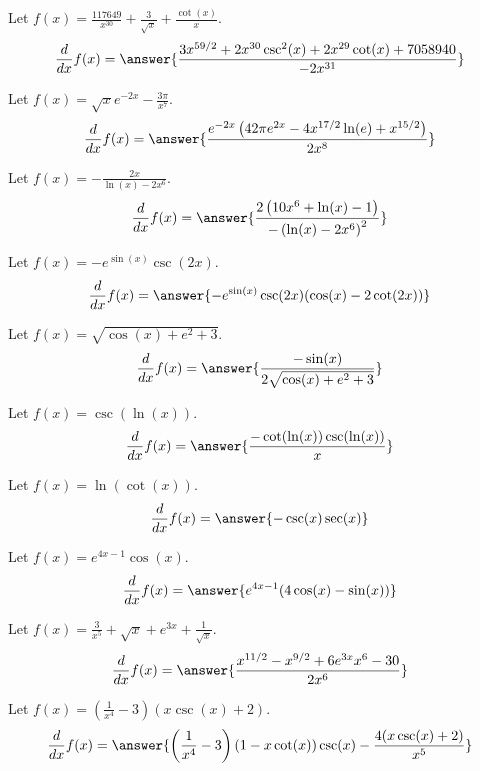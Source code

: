 \documentclass{ximera}
\begin{document}
\begin{shuffle}
\begin{exercise}
Let $f(x)=\frac{117649}{x^{30}}+\frac{3}{\sqrt{x}}+\frac{\cot (x)}{x}$.
\[
\ddx f(x) = \answer{\frac{3 x^{59/2}+2 x^{30} \csc ^2(x)+2 x^{29} \cot (x)+7058940}{-2 x^{31}}}
\]
\end{exercise}

\begin{exercise}
Let $f(x)=\sqrt{x} e^{-2 x}-\frac{3 \pi }{x^7}$.
\[
\ddx f(x) = \answer{\frac{e^{-2 x} \left(42 \pi  e^{2 x}-4 x^{17/2} \ln (e)+x^{15/2}\right)}{2 x^8}}
\]
\end{exercise}

\begin{exercise}
Let $f(x)=-\frac{2 x}{\ln (x)-2 x^6}$.
\[
\ddx f(x) = \answer{\frac{2 \left(10 x^6+\ln (x)-1\right)}{-\left(\ln (x)-2 x^6\right)^2}}
\]
\end{exercise}

\begin{exercise}
Let $f(x)=-e^{\sin (x)} \csc (2 x)$.
\[
\ddx f(x) = \answer{-e^{\sin (x)} \csc (2 x) (\cos (x)-2 \cot (2 x))}
\]
\end{exercise}

\begin{exercise}
Let $f(x)=\sqrt{\cos (x)+e^2+3}$.
\[
\ddx f(x) = \answer{\frac{-\sin (x)}{2 \sqrt{\cos (x)+e^2+3}}}
\]
\end{exercise}

\begin{exercise}
Let $f(x)=\csc (\ln (x))$.
\[
\ddx f(x) = \answer{\frac{-\cot (\ln (x)) \csc (\ln (x))}{x}}
\]
\end{exercise}

\begin{exercise}
Let $f(x)=\ln (\cot (x))$.
\[
\ddx f(x) = \answer{-\csc (x) \sec (x)}
\]
\end{exercise}

\begin{exercise}
Let $f(x)=e^{4 x-1} \cos (x)$.
\[
\ddx f(x) = \answer{e^{4 x-1} (4 \cos (x)-\sin (x))}
\]
\end{exercise}

\begin{exercise}
Let $f(x)=\frac{3}{x^5}+\sqrt{x}+e^{3 x}+\frac{1}{\sqrt{x}}$.
\[
\ddx f(x) = \answer{\frac{x^{11/2}-x^{9/2}+6 e^{3 x} x^6-30}{2 x^6}}
\]
\end{exercise}

\begin{exercise}
Let $f(x)=\left(\frac{1}{x^4}-3\right) (x \csc (x)+2)$.
\[
\ddx f(x) = \answer{\left(\frac{1}{x^4}-3\right) (1-x \cot (x)) \csc (x)-\frac{4 (x \csc (x)+2)}{x^5}}
\]
\end{exercise}


\end{shuffle}
\end{document}
